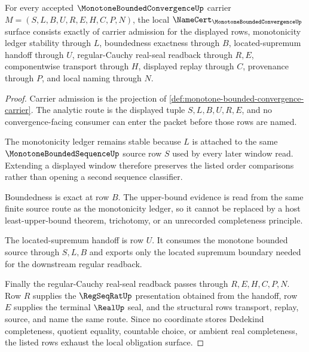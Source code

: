 \begin{theorem}
\label{thm:monotone-bounded-convergence-namecert-obligation-surface}
For every accepted $\MonotoneBoundedConvergenceUp$ carrier $M=(S,L,B,U,R,E,H,C,P,N)$, the local $\NameCert_{\MonotoneBoundedConvergenceUp}$ surface consists exactly of carrier admission for the displayed rows, monotonicity ledger stability through $L$, boundedness exactness through $B$, located-supremum handoff through $U$, regular-Cauchy real-seal readback through $R,E$, componentwise transport through $H$, displayed replay through $C$, provenance through $P$, and local naming through $N$.
\end{theorem}
\begin{proof}
Carrier admission is the projection of \autoref{def:monotone-bounded-convergence-carrier}. The analytic route is the displayed tuple $S,L,B,U,R,E$, and no convergence-facing consumer can enter the packet before those rows are named.

The monotonicity ledger remains stable because $L$ is attached to the same $\MonotoneBoundedSequenceUp$ source row $S$ used by every later window read. Extending a displayed window therefore preserves the listed order comparisons rather than opening a second sequence classifier.

Boundedness is exact at row $B$. The upper-bound evidence is read from the same finite source route as the monotonicity ledger, so it cannot be replaced by a host least-upper-bound theorem, trichotomy, or an unrecorded completeness principle.

The located-supremum handoff is row $U$. It consumes the monotone bounded source through $S,L,B$ and exports only the located supremum boundary needed for the downstream regular readback.

Finally the regular-Cauchy real-seal readback passes through $R,E,H,C,P,N$. Row $R$ supplies the $\RegSeqRatUp$ presentation obtained from the handoff, row $E$ supplies the terminal $\RealUp$ seal, and the structural rows transport, replay, source, and name the same route. Since no coordinate stores Dedekind completeness, quotient equality, countable choice, or ambient real completeness, the listed rows exhaust the local obligation surface.
\end{proof}


